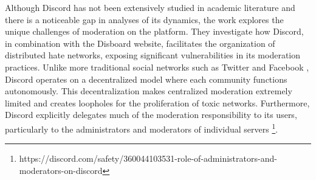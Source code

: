 Although Discord has not been extensively studied in academic literature and there is a noticeable gap in analyses of its dynamics, the work \cite{heslep2024mapping} explores the unique challenges of moderation on the platform. They investigate how Discord, in combination with the Disboard website, facilitates the organization of distributed hate networks, exposing significant vulnerabilities in its moderation practices. Unlike more traditional social networks such as Twitter and Facebook \cite{wilson2020hate}, Discord operates on a decentralized model where each community functions autonomously. This decentralization makes centralized moderation extremely limited and creates loopholes for the proliferation of toxic networks. Furthermore, Discord explicitly delegates much of the moderation responsibility to its users, particularly to the administrators and moderators of individual servers \footnote{https://discord.com/safety/360044103531-role-of-administrators-and-moderators-on-discord}.


